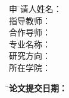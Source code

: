 \vspace{15mm}

\begin{tabbing}
\hspace{30mm} \songti\sihao 申 \hspace{-2.7mm} \= \songti\sihao 请人姓名： \= \underline{\makebox[6cm]{\sihao\zjuauthorname}} \\[2mm]
              \> \songti\sihao 指导教师： \> \underline{\makebox[6cm]{\sihao\zjumentorma}} \\[2mm]
              \> \songti\sihao 合作导师： \> \underline{\makebox[6cm]{\sihao\zjumentorco}} \\[2mm]
              \> \songti\sihao 专业名称： \> \underline{\makebox[6cm]{\sihao\zjumajor}} \\[2mm]
              \> \songti\sihao 研究方向： \> \underline{\makebox[6cm]{\sihao\zjusubject}} \\[2mm]
              \> \songti\sihao 所在学院： \> \underline{\makebox[6cm]{\sihao\zjuschool}}
\end{tabbing}

\vspace{10mm}

\begin{tabbing}
\hspace{35mm} \= \songti\sihao\bfseries 论文提交日期： \= \underline{\makebox[50mm]{\songti\sihao\bfseries\zjuapprovaldate}}
\end{tabbing}


